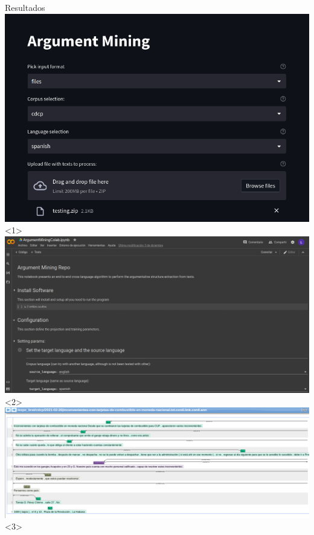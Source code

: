 \documentclass{beamer}
\begin{document}
\begin{frame}{Resultados}
    \includegraphics[keepaspectratio=true,height=\textheight,width=\textwidth]{Graphics/streamlit_app.png}<1>
    \includegraphics[keepaspectratio=true,height=\textheight,width=\textwidth]{Graphics/colab.png}<2>
    \includegraphics[keepaspectratio=true,height=\textheight,width=\textwidth]{Graphics/brat_cdcp_example.png}<3>
\end{frame}
\end{document}
